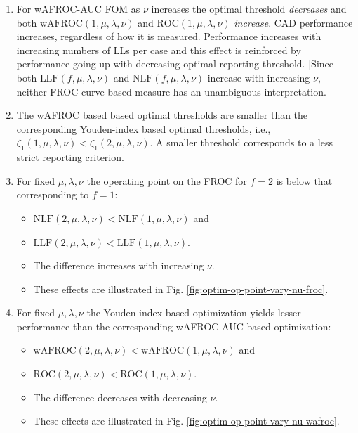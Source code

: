 \documentclass[
]{book}
\providecommand{\tightlist}{%
  \setlength{\itemsep}{0pt}\setlength{\parskip}{0pt}}
\begin{document}
\begin{enumerate}
\def\labelenumi{\arabic{enumi}.}
\item
  For wAFROC-AUC FOM as \(\nu\) increases the optimal threshold \emph{decreases} and both \(\text{wAFROC} \left ( 1, \mu, \lambda, \nu \right )\) and \(\text{ROC} \left ( 1, \mu, \lambda, \nu \right )\) \emph{increase}. CAD performance increases, regardless of how it is measured. Performance increases with increasing numbers of LLs per case and this effect is reinforced by performance going up with decreasing optimal reporting threshold. {[}Since both \(\text{LLF} \left ( f, \mu, \lambda, \nu \right )\) and \(\text{NLF} \left ( f, \mu, \lambda, \nu \right )\) increase with increasing \(\nu\), neither FROC-curve based measure has an unambiguous interpretation.
\item
  The wAFROC based based optimal thresholds are smaller than the corresponding Youden-index based optimal thresholds, i.e., \(\zeta_{1} \left ( 1, \mu, \lambda, \nu \right ) < \zeta_{1} \left ( 2, \mu, \lambda, \nu \right )\). A smaller threshold corresponds to a less strict reporting criterion.
\item
  For fixed \(\mu, \lambda, \nu\) the operating point on the FROC for \(f = 2\) is below that corresponding to \(f = 1\):

  \begin{itemize}
  \tightlist
  \item
    \(\text{NLF} \left (2, \mu, \lambda, \nu \right ) < \text{NLF} \left (1, \mu, \lambda, \nu \right )\) and
  \item
    \(\text{LLF} \left (2, \mu, \lambda, \nu \right ) < \text{LLF} \left (1, \mu, \lambda, \nu \right )\).
  \item
    The difference increases with increasing \(\nu\).
  \item
    These effects are illustrated in Fig. \ref{fig:optim-op-point-vary-nu-froc}.
  \end{itemize}
\item
  For fixed \(\mu, \lambda, \nu\) the Youden-index based optimization yields lesser performance than the corresponding wAFROC-AUC based optimization:

  \begin{itemize}
  \tightlist
  \item
    \(\text{wAFROC} \left (2, \mu, \lambda, \nu \right ) < \text{wAFROC} \left (1, \mu, \lambda, \nu \right )\) and
  \item
    \(\text{ROC} \left (2, \mu, \lambda, \nu \right ) < \text{ROC} \left (1, \mu, \lambda, \nu \right )\).
  \item
    The difference decreases with decreasing \(\nu\).
  \item
    These effects are illustrated in Fig. \ref{fig:optim-op-point-vary-nu-wafroc}.
  \end{itemize}
\end{enumerate}
\end{document}
